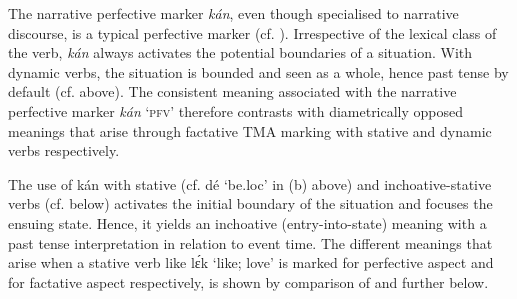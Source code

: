 \ea%
    \label{ex:key:325}
\z
\z

The narrative perfective marker \textit{kán}, even though specialised to narrative discourse, is a typical perfective marker (cf. ). Irrespective of the lexical class of the verb, \textit{kán} always activates the potential boundaries of a situation. With dynamic verbs, the situation is bounded and seen as a whole, hence past tense by default (cf.  above). The consistent meaning associated with the narrative perfective marker \textit{kán} ‘\textsc{pfv’} therefore contrasts with diametrically opposed meanings that arise through factative TMA marking with stative and dynamic verbs respectively.


The use of kán with stative (cf. dé ‘be.loc’ in (b) above) and inchoative-stative verbs (cf.  below) activates the initial boundary of the situation and focuses the ensuing state. Hence, it yields an inchoative (entry-into-state) meaning with a past tense interpretation in relation to event time. The different meanings that arise when a stative verb like lɛ́k ‘like; love’ is marked for perfective aspect and for factative aspect respectively, is shown by comparison of  and  further below. 



